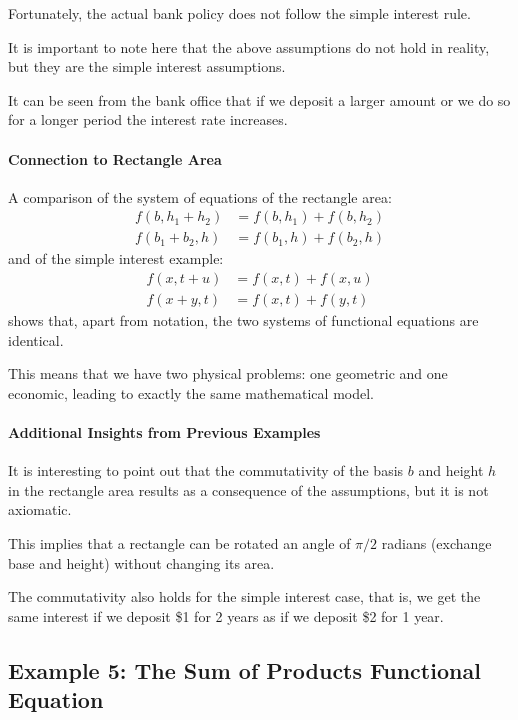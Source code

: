 Fortunately, the actual bank policy does not follow the simple interest rule.

It is important to note here that the above assumptions do not hold in reality, but they are the simple interest assumptions.

It can be seen from the bank office that if we deposit a larger amount or we do so for a longer period the interest rate increases.

\paragraph{Connection to Rectangle Area}
A comparison of the system of equations of the rectangle area:
\begin{align}
f(b, h_1 + h_2) &= f(b, h_1) + f(b, h_2) \\
f(b_1 + b_2, h) &= f(b_1, h) + f(b_2, h)
\end{align}
and of the simple interest example:
\begin{align}
f(x, t + u) &= f(x, t) + f(x, u) \\
f(x + y, t) &= f(x, t) + f(y, t)
\end{align}
shows that, apart from notation, the two systems of functional equations are identical.

This means that we have two physical problems: one geometric and one economic, leading to exactly the same mathematical model.


\paragraph{Additional Insights from Previous Examples}
It is interesting to point out that the commutativity of the basis $b$ and height $h$ in the rectangle area results as a consequence of the assumptions, but it is not axiomatic.

This implies that a rectangle can be rotated an angle of $\pi/2$ radians (exchange base and height) without changing its area.

The commutativity also holds for the simple interest case, that is, we get the same interest if we deposit \$1 for 2 years as if we deposit \$2 for 1 year.


\subsection{Example 5: The Sum of Products Functional Equation}
